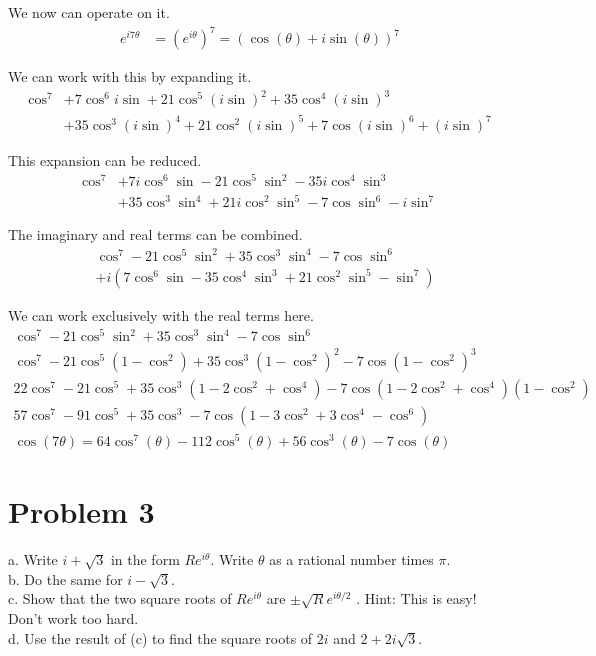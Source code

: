 \documentclass[12pt]{article}
\begin{document}
We now can operate on it.
\begin{align}
    e^{i7\theta}    &=  (e^{i\theta})^7
        =   \left( \cos(\theta) + i\sin(\theta) \right)^7
\end{align}

We can work with this by expanding it.
\begin{align*}
    \cos^7  &+ 7\cos^6 i\sin + 21\cos^5 (i\sin)^2 + 35\cos^4 (i\sin)^3 \\
            &+ 35\cos^3(i\sin)^4 + 21\cos^2 (i\sin)^5 + 7\cos (i\sin)^6 + (i\sin)^7
\end{align*}

This expansion can be reduced.
\begin{align*}
    \cos^7  &+ 7i\cos^6 \sin - 21\cos^5 \sin^2 - 35i\cos^4 \sin^3 \\
            &+ 35\cos^3\sin^4 + 21i\cos^2\sin^5 - 7\cos\sin^6 - i\sin^7
\end{align*}

The imaginary and real terms can be combined.
\begin{align*}
    &\cos^7 - 21\cos^5\sin^2 + 35\cos^3\sin^4 - 7\cos\sin^6\\
    &+ i\left(7\cos^6\sin - 35\cos^4\sin^3 + 21\cos^2\sin^5 - \sin^7\right)
\end{align*}

We can work exclusively with the real terms here.
\begin{gather}
    \cos^7 - 21\cos^5\sin^2 + 35\cos^3\sin^4 - 7\cos\sin^6\\
    \cos^7 - 21\cos^5(1 - \cos^2) + 35\cos^3(1 - \cos^2)^2 - 7\cos(1 - \cos^2)^3\\
    22\cos^7 - 21\cos^5 + 35\cos^3(1 - 2\cos^2 + \cos^4) - 7\cos(1 - 2\cos^2 + \cos^4)(1 - \cos^2)\\
    57\cos^7 - 91\cos^5 + 35\cos^3 - 7\cos(1 - 3\cos^2 + 3\cos^4 - \cos^6)\\
    \cos(7\theta) = \boxed{64\cos^7(\theta) - 112\cos^5(\theta) + 56\cos^3(\theta) - 7\cos(\theta)}
\end{gather}

\pagebreak
\section{Problem 3}
a. Write $i + \sqrt{3}$ in the form $R e^{i\theta}$. Write $\theta$ as a rational number times $\pi$.\\
b. Do the same for $i - \sqrt{3}$.\\
c. Show that the two square roots of $R e^{i\theta}$ are $\pm \sqrt{R} e^{i\theta/2}$ . Hint: This is easy! Don't
work too hard.\\
d. Use the result of (c) to ﬁnd the square roots of $2i$ and $2 + 2i\sqrt{3}$.
\end{document}
